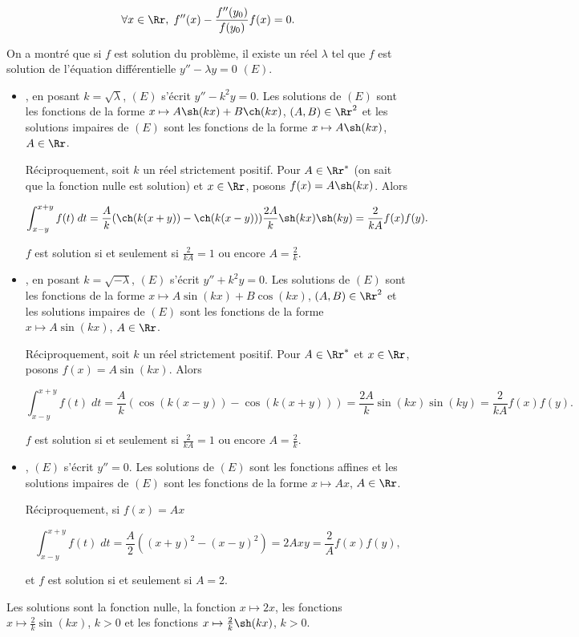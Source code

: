 {{$$\forall x\in\Rr,\;f''(x)-\frac{f''(y_0)}{f(y_0)}f(x)=0.$$

On a montré que si $f$ est solution du problème, il existe un réel $\lambda$ tel que $f$ est solution de l'équation différentielle $y''-\lambda y=0$ $(E)$.

\begin{itemize}
\item[- si $\lambda>0$], en posant $k=\sqrt{\lambda}$, $(E)$ s'écrit $y''-k^2y=0$. Les solutions de $(E)$ sont les fonctions de la forme $x\mapsto A\sh(kx)+B\ch(kx)$, $(A,B)\in\Rr^2$ et les solutions impaires de $(E)$ sont les fonctions de la forme $x\mapsto A\sh(kx)$, $A\in\Rr$.

Réciproquement, soit $k$ un réel strictement positif. Pour $A\in\Rr^*$ (on sait que la fonction nulle est solution) et $x\in\Rr$, posons $f(x)=A\sh(kx)$. Alors

$$\int_{x-y}^{x+y}f(t)\;dt=\frac{A}{k}(\ch(k(x+y))-\ch(k(x-y)))\frac{2A}{k}\sh(kx)\sh(ky)=\frac{2}{kA}f(x)f(y).$$

$f$ est solution si et seulement si $\frac{2}{kA}=1$ ou encore $A=\frac{2}{k}$.

\item[- si $\lambda<0$], en posant $k=\sqrt{-\lambda}$, $(E)$ s'écrit $y''+k^2y=0$. Les solutions de $(E)$ sont les fonctions de la forme $x\mapsto A\sin(kx)+B\cos(kx)$, $(A,B)\in\Rr^2$ et les solutions impaires de $(E)$ sont les fonctions de la forme $x\mapsto A\sin(kx)$, $A\in\Rr$.

Réciproquement, soit $k$ un réel strictement positif. Pour $A\in\Rr^*$ et $x\in\Rr$, posons $f(x)=A\sin(kx)$. Alors

$$\int_{x-y}^{x+y}f(t)\;dt=\frac{A}{k}(\cos(k(x-y))-\cos(k(x+y)))=\frac{2A}{k}\sin(kx)\sin(ky)=\frac{2}{kA}f(x)f(y).$$

$f$ est solution si et seulement si $\frac{2}{kA}=1$ ou encore $A=\frac{2}{k}$.

\item[- si $\lambda=0$], $(E)$ s'écrit $y''=0$. Les solutions de $(E)$ sont les fonctions affines et les solutions impaires de $(E)$ sont les fonctions de la forme $x\mapsto Ax$, $A\in\Rr$.

Réciproquement, si $f(x)=Ax$

$$\int_{x-y}^{x+y}f(t)\;dt=\frac{A}{2}((x+y)^2-(x-y)^2)=2Axy=\frac{2}{A}f(x)f(y),$$

et $f$ est solution si et seulement si $A=2$.

\end{itemize}

Les solutions sont la fonction nulle, la fonction $x\mapsto2x$, les fonctions $x\mapsto\frac{2}{k}\sin(kx)$, $k>0$ et les fonctions $x\mapsto\frac{2}{k}\sh(kx)$, $k>0$.
}
}
